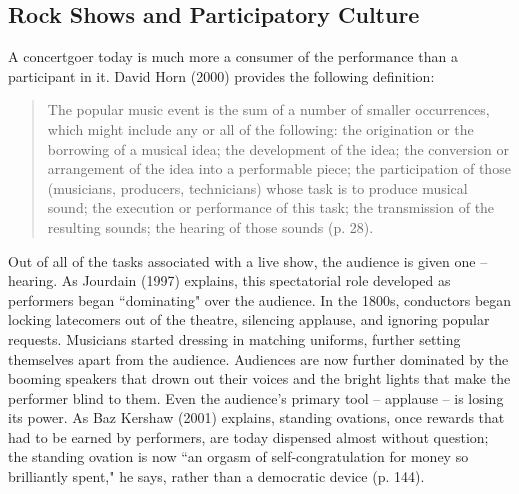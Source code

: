 
\subsection{Rock Shows and Participatory Culture}

A concertgoer today is much more a consumer of the performance than a participant in it. David Horn (2000) provides the following definition:
\begin{quotation}
The popular music event is the sum of a number of smaller occurrences, which might include any or all of the following: the origination or the borrowing of a musical idea; the development of the idea; the conversion or arrangement of the idea into a performable piece; the participation of those (musicians, producers, technicians) whose task is to produce musical sound; the execution or performance of this task; the transmission of the resulting sounds; the hearing of those sounds (p. 28).
\end{quotation}
Out of all of the tasks associated with a live show, the audience is given one -- hearing. As Jourdain (1997) explains, this spectatorial role developed as performers began ``dominating" over the audience. In the 1800s, conductors began locking latecomers out of the theatre, silencing applause, and ignoring popular requests. Musicians started dressing in matching uniforms, further setting themselves apart from the audience. Audiences are now further dominated by the booming speakers that drown out their voices and the bright lights that make the performer blind to them. Even the audience's primary tool -- applause -- is losing its power. As Baz Kershaw (2001) explains, standing ovations, once rewards that had to be earned by performers, are today dispensed almost without question; the standing ovation is now ``an orgasm of self-congratulation for money so brilliantly spent," he says, rather than a democratic device (p. 144).

